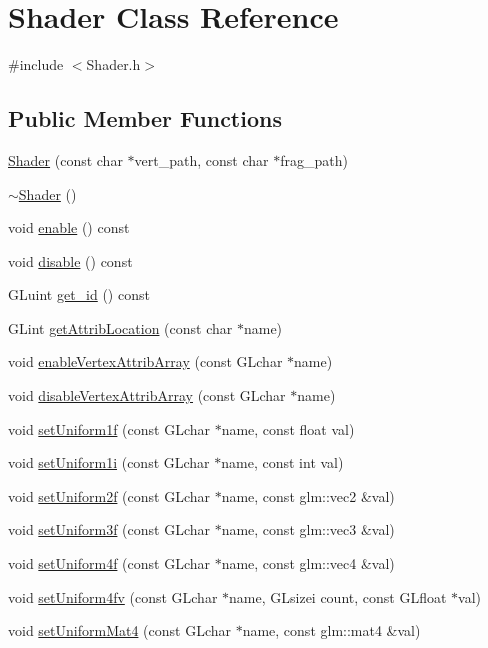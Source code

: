 \hypertarget{class_shader}{}\section{Shader Class Reference}
\label{class_shader}


{\ttfamily \#include $<$Shader.\+h$>$}

\subsection*{Public Member Functions}
\begin{DoxyCompactItemize}
\item 
\hyperlink{class_shader_ae2a0af7abf90c72ab25a394a24ea92f1}{Shader} (const char $\ast$vert\+\_\+path, const char $\ast$frag\+\_\+path)
\item 
\hyperlink{class_shader_aff01df87e8a102f270b5b135a295e59d}{$\sim$\+Shader} ()
\item 
void \hyperlink{class_shader_a048e3e3d86daff7b8f61432a866c529f}{enable} () const
\item 
void \hyperlink{class_shader_af962c95adc950bd28afbc81631ad3957}{disable} () const
\item 
G\+Luint \hyperlink{class_shader_a3e18d47a57e86322c1e76bf78f13ca17}{get\+\_\+id} () const
\item 
G\+Lint \hyperlink{class_shader_a6dda73168720b8d4871f9a2340c914d0}{get\+Attrib\+Location} (const char $\ast$name)
\item 
void \hyperlink{class_shader_aee904a5bc799d32e28a9007f82f7c8f3}{enable\+Vertex\+Attrib\+Array} (const G\+Lchar $\ast$name)
\item 
void \hyperlink{class_shader_a7f5da760f0edbd72487f8d7905cf4216}{disable\+Vertex\+Attrib\+Array} (const G\+Lchar $\ast$name)
\item 
void \hyperlink{class_shader_af496d61361a0bde57ccb34e2d5933c43}{set\+Uniform1f} (const G\+Lchar $\ast$name, const float val)
\item 
void \hyperlink{class_shader_a9e34828e84023305a0a9454b20ebae8e}{set\+Uniform1i} (const G\+Lchar $\ast$name, const int val)
\item 
void \hyperlink{class_shader_a80c178459f4ac07e83c53a95dc1c5ec8}{set\+Uniform2f} (const G\+Lchar $\ast$name, const glm\+::vec2 \&val)
\item 
void \hyperlink{class_shader_a3ea68dd9c68a88fcc2d7abe873c9ecf2}{set\+Uniform3f} (const G\+Lchar $\ast$name, const glm\+::vec3 \&val)
\item 
void \hyperlink{class_shader_a3ae217faa57e267bfd54fe91cd72b6ba}{set\+Uniform4f} (const G\+Lchar $\ast$name, const glm\+::vec4 \&val)
\item 
void \hyperlink{class_shader_a15647c94eb01764b51527eb00f85c9c3}{set\+Uniform4fv} (const G\+Lchar $\ast$name, G\+Lsizei count, const G\+Lfloat $\ast$val)
\item 
void \hyperlink{class_shader_a15a1246f61f63dd1d202bb59447dc191}{set\+Uniform\+Mat4} (const G\+Lchar $\ast$name, const glm\+::mat4 \&val)
\end{DoxyCompactItemize}


